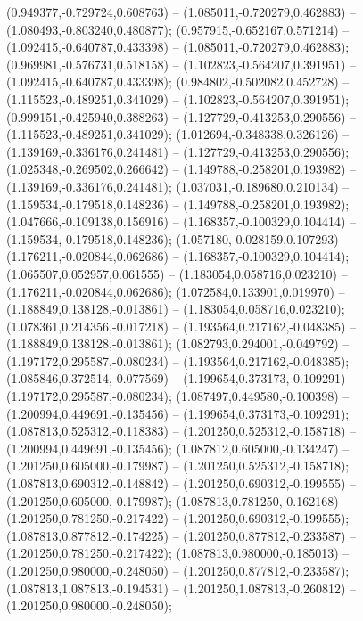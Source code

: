  (0.949377,-0.729724,0.608763) -- (1.085011,-0.720279,0.462883) -- (1.080493,-0.803240,0.480877);
 (0.957915,-0.652167,0.571214) -- (1.092415,-0.640787,0.433398) -- (1.085011,-0.720279,0.462883);
 (0.969981,-0.576731,0.518158) -- (1.102823,-0.564207,0.391951) -- (1.092415,-0.640787,0.433398);
 (0.984802,-0.502082,0.452728) -- (1.115523,-0.489251,0.341029) -- (1.102823,-0.564207,0.391951);
 (0.999151,-0.425940,0.388263) -- (1.127729,-0.413253,0.290556) -- (1.115523,-0.489251,0.341029);
 (1.012694,-0.348338,0.326126) -- (1.139169,-0.336176,0.241481) -- (1.127729,-0.413253,0.290556);
 (1.025348,-0.269502,0.266642) -- (1.149788,-0.258201,0.193982) -- (1.139169,-0.336176,0.241481);
 (1.037031,-0.189680,0.210134) -- (1.159534,-0.179518,0.148236) -- (1.149788,-0.258201,0.193982);
 (1.047666,-0.109138,0.156916) -- (1.168357,-0.100329,0.104414) -- (1.159534,-0.179518,0.148236);
 (1.057180,-0.028159,0.107293) -- (1.176211,-0.020844,0.062686) -- (1.168357,-0.100329,0.104414);
 (1.065507,0.052957,0.061555) -- (1.183054,0.058716,0.023210) -- (1.176211,-0.020844,0.062686);
 (1.072584,0.133901,0.019970) -- (1.188849,0.138128,-0.013861) -- (1.183054,0.058716,0.023210);
 (1.078361,0.214356,-0.017218) -- (1.193564,0.217162,-0.048385) -- (1.188849,0.138128,-0.013861);
 (1.082793,0.294001,-0.049792) -- (1.197172,0.295587,-0.080234) -- (1.193564,0.217162,-0.048385);
 (1.085846,0.372514,-0.077569) -- (1.199654,0.373173,-0.109291) -- (1.197172,0.295587,-0.080234);
 (1.087497,0.449580,-0.100398) -- (1.200994,0.449691,-0.135456) -- (1.199654,0.373173,-0.109291);
 (1.087813,0.525312,-0.118383) -- (1.201250,0.525312,-0.158718) -- (1.200994,0.449691,-0.135456);
 (1.087812,0.605000,-0.134247) -- (1.201250,0.605000,-0.179987) -- (1.201250,0.525312,-0.158718);
 (1.087813,0.690312,-0.148842) -- (1.201250,0.690312,-0.199555) -- (1.201250,0.605000,-0.179987);
 (1.087813,0.781250,-0.162168) -- (1.201250,0.781250,-0.217422) -- (1.201250,0.690312,-0.199555);
 (1.087813,0.877812,-0.174225) -- (1.201250,0.877812,-0.233587) -- (1.201250,0.781250,-0.217422);
 (1.087813,0.980000,-0.185013) -- (1.201250,0.980000,-0.248050) -- (1.201250,0.877812,-0.233587);
 (1.087813,1.087813,-0.194531) -- (1.201250,1.087813,-0.260812) -- (1.201250,0.980000,-0.248050);

